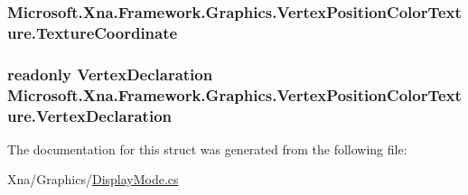 \subsubsection[{Texture\+Coordinate}]{ Microsoft.\+Xna.\+Framework.\+Graphics.\+Vertex\+Position\+Color\+Texture.\+Texture\+Coordinate}\label{struct_microsoft_1_1_xna_1_1_framework_1_1_graphics_1_1_vertex_position_color_texture_ad251a4052d6f22addba2aabaf99e4b3f}
\hypertarget{struct_microsoft_1_1_xna_1_1_framework_1_1_graphics_1_1_vertex_position_color_texture_a73ca19f8a4679d00baf9351b19ee6c34}{}
\subsubsection[{Vertex\+Declaration}]{\setlength{\rightskip}{0pt plus 5cm}readonly {\bf Vertex\+Declaration} Microsoft.\+Xna.\+Framework.\+Graphics.\+Vertex\+Position\+Color\+Texture.\+Vertex\+Declaration\hspace{0.3cm}{\ttfamily [static]}}\label{struct_microsoft_1_1_xna_1_1_framework_1_1_graphics_1_1_vertex_position_color_texture_a73ca19f8a4679d00baf9351b19ee6c34}


The documentation for this struct was generated from the following file\+:\begin{DoxyCompactItemize}
\item 
Xna/\+Graphics/\hyperlink{_display_mode_8cs}{Display\+Mode.\+cs}\end{DoxyCompactItemize}
